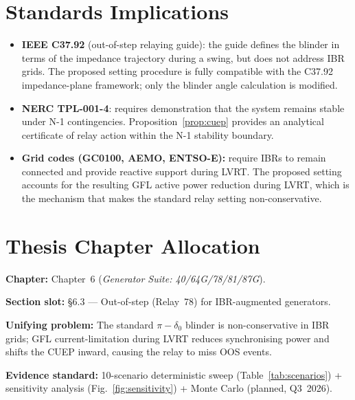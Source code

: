 \documentclass[11pt,a4paper]{article}
\newcommand{\dz}{\delta_0}         %
\begin{document}
\section{Standards Implications}
\label{sec:standards}

\begin{itemize}
  \item \textbf{IEEE C37.92} (out-of-step relaying guide): the guide defines
        the blinder in terms of the impedance trajectory during a swing, but
        does not address IBR grids.  The proposed setting procedure is fully
        compatible with the C37.92 impedance-plane framework; only the blinder
        angle calculation is modified.

  \item \textbf{NERC TPL-001-4}: requires demonstration that the system
        remains stable under N-1 contingencies.  Proposition~\ref{prop:cuep}
        provides an analytical certificate of relay action within the N-1
        stability boundary.

  \item \textbf{Grid codes (GC0100, AEMO, ENTSO-E):} require IBRs to remain
        connected and provide reactive support during LVRT.  The proposed
        setting accounts for the resulting GFL active power reduction during
        LVRT, which is the mechanism that makes the standard relay setting
        non-conservative.
\end{itemize}

\section{Thesis Chapter Allocation}
\label{sec:thesis}

\textbf{Chapter:} Chapter~6 (\textit{Generator Suite: 40/64G/78/81/87G}).

\textbf{Section slot:} \S6.3 — Out-of-step (Relay~78) for IBR-augmented
generators.

\textbf{Unifying problem:} The standard $\pi - \dz$ blinder is non-conservative
in IBR grids; GFL current-limitation during LVRT reduces synchronising power
and shifts the CUEP inward, causing the relay to miss OOS events.

\textbf{Evidence standard:} 10-scenario deterministic sweep (Table~\ref{tab:scenarios})
+ sensitivity analysis (Fig.~\ref{fig:sensitivity}) + Monte Carlo (planned,
Q3~2026).
\end{document}
